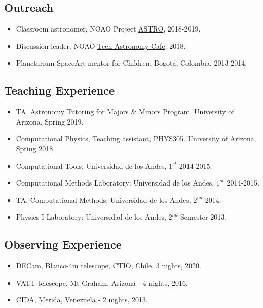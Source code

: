 \documentclass[UTF8]{article}
\begin{document}
\subsection*{Outreach}
\begin{itemize}
  \setlength\itemsep{0.0em}
  \renewcommand\labelitemi{$\cdot$}
\item Classroom astronomer, NOAO Project \href{https://www.noao.edu/education/astro/}{ASTRO}, 2018-2019.
\item Discussion leader, NOAO \href{http://www.teenastronomycafe.org/}{Teen Astronomy Cafe}, 2018.
\item Planetarium SpaceArt mentor for Children, Bogot\'a, Colombia, 2013-2014.
\end{itemize}

\subsection*{Teaching Experience}
\begin{itemize}
  \setlength\itemsep{0.0em}
  \renewcommand\labelitemi{$\cdot$}
\item TA, Astronomy Tutoring for
Majors \& Minors Program. University of Arizona, Spring 2019. 
\item Computational Physics, Teaching assistant, PHYS305. University of Arizona. Spring 2018.
\item Computational Tools: Universidad de los Andes, $1^{st}$ 2014-2015.
\item Computational Methods Laboratory: Universidad de los Andes, $1^{st}$ 2014-2015.
\item TA, Computational Methods: Universidad de los Andes, $2^{nd}$ 2014.
\item Physics I Laboratory: Universidad de los Andes, $2^{nd}$ Semester-2013.
\end{itemize}

\subsection*{Observing Experience}
\begin{itemize}
  \setlength\itemsep{0.0em}
  \renewcommand\labelitemi{$\cdot$}
    \item DECam, Blanco-4m telescope, CTIO, Chile. 3 nights, 2020.
    \item VATT telescope. Mt Graham, Arizona - 4 nights, 2016.
    \item CIDA, Merida, Venezuela - 2 nights, 2013.
\end{itemize}
\end{document}
